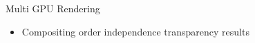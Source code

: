 \documentclass{beamer}
\begin{document}
\begin{frame}{Multi GPU Rendering}
\begin{itemize}
\begin{figure}
{			}
		\end{figure}
	
		\item Compositing order independence transparency results
		\begin{figure}
			\centering
		\end{figure}
	\end{itemize}
\end{frame}
\end{document}
